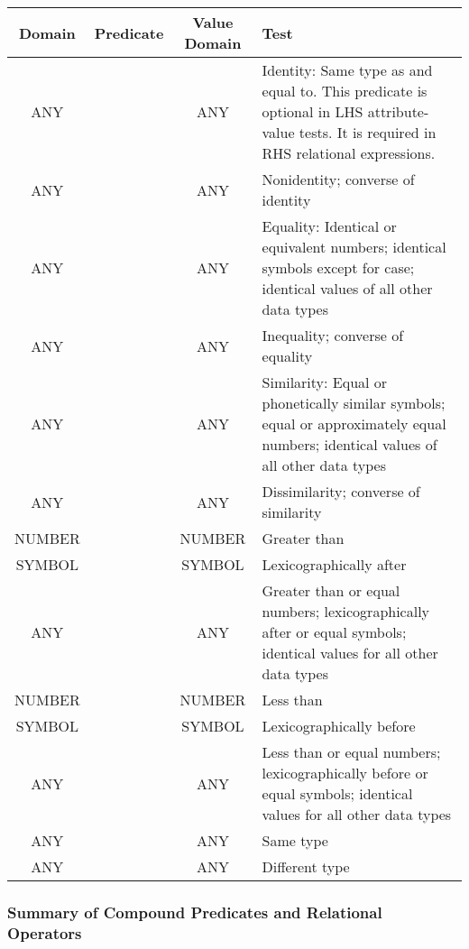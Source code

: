 \begin{tabularx}{\columnwidth}{cccX}
  \toprule
  Domain & Predicate & Value Domain & Test \\
  \midrule
  ANY & \co{==} & ANY & Identity: Same type as and equal to.
                        This predicate is optional in
                        LHS attribute-value tests. It is required
                        in RHS relational expressions. \\
  ANY & \co{<>} & ANY & Nonidentity; converse of identity \\
  ANY & \co{=}  & ANY & Equality: Identical or equivalent numbers;
                        identical symbols except for case;
                        identical values of all other 
                        data types                      \\
  ANY & \co{-=} & ANY & Inequality; converse of   
                        equality \\
  ANY & \co{\textasciitilde=} & ANY & Similarity: Equal or phonetically
                                      similar symbols; equal or
                                      approximately equal  numbers; 
                                      identical values of all other
                                      data types \\
  ANY & \co{-\textasciitilde=} & ANY & Dissimilarity; converse of similarity \\
  NUMBER & \co{>} & NUMBER & Greater than \\
  SYMBOL & \co{>} & SYMBOL & Lexicographically after \\
  ANY    & \co{>=} & ANY & Greater than or equal numbers;
                           lexicographically after or  equal symbols;
                           identical values for all other data types \\
  NUMBER & \co{<} & NUMBER & Less than \\
  SYMBOL & \co{<} & SYMBOL & Lexicographically before \\
  ANY    & \co{<=} & ANY & Less than or equal numbers;
                           lexicographically before or equal symbols;
                           identical values  for all other data types \\
  ANY & \co{<=>} & ANY & Same type \\
  ANY & \co{<->} & ANY & Different type \\
  \bottomrule
\end{tabularx}

\subsubsection{Summary of Compound Predicates and Relational Operators}

